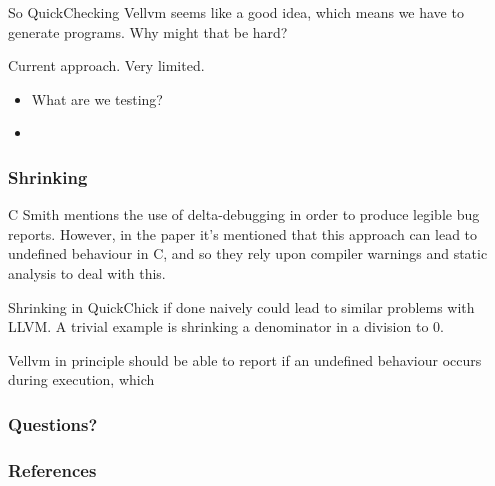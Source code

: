 \documentclass{beamer}
\begin{document}
\begin{frame}
  So QuickChecking Vellvm seems like a good idea, which means we have
  to generate programs. Why might that be hard?
\end{frame}

\begin{frame}
  Current approach. Very limited.

  \begin{itemize}
  \item What are we testing?
  \item
  \end{itemize}
\end{frame}

\begin{frame}
  \frametitle{Shrinking}

  C Smith mentions the use of delta-debugging in order to produce
  legible bug reports. However, in the paper it's mentioned that this
  approach can lead to undefined behaviour in C, and so they rely upon
  compiler warnings and static analysis to deal with this.

  Shrinking in QuickChick if done naively could lead to similar
  problems with LLVM. A trivial example is shrinking a denominator in
  a division to 0.

  Vellvm in principle should be able to report if an undefined
  behaviour occurs during execution, which 
\end{frame}

\begin{frame}
  \frametitle{Questions?}

\end{frame}

\begin{frame}
  \frametitle{References}

  \nocite{*}
  \printbibliography
\end{frame}
\end{document}
